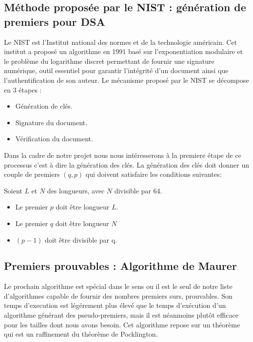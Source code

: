 \documentclass[a4paper,11pt]{article}
\begin{document}
\subsection{Méthode proposée par le NIST :  génération de premiers pour DSA}
Le NIST est l'Institut national des normes et de la technologie américain. Cet institut a proposé un algorithme en 1991 basé sur l'exponentiation modulaire et le problème du logarithme discret permettant de fournir une signature numérique, outil essentiel pour garantir l'intégrité d'un document  ainsi que l'authentification de son auteur.\newline
Le mécanisme proposé par le NIST se décompose en 3 étapes : \newline
\begin{itemize}
\item Génération de clés. 
\item Signature du document.
\item Vérification du document.
\end{itemize}
\medbreak
Dans la cadre de notre projet nous nous intéresserons à la premiere étape de ce processus c'est à dire la génération des clés. 
La génération des clés doit donner un couple de premiers $(q,p)$ qui doivent satisfaire les conditions suivantes:


Soient $L$ et $N$ des longueurs, avec $N$ divisible par 64.
\medbreak
\begin{itemize}
\item Le premier $p$ doit être longueur $L$.  
\item Le premier $q$ doit être longueur $N$
\item $(p-1)$ doit être divisible par q.
\end{itemize}


\subsection{Premiers prouvables : Algorithme de Maurer}

Le prochain algorithme est spécial dans le sens ou il est le seul de notre liste d'algorithmes capable de fournir des nombres premiers surs, prouvables. Son temps d'execution est légérement plus élevé que le temps d'exécution d'un algorithme générant des pseudo-premiers, mais il est néanmoins plutôt efficace pour les tailles dont nous avons besoin. Cet algorithme repose sur un théorème qui est un raffinement du théorème de Pocklington.
\end{document}
